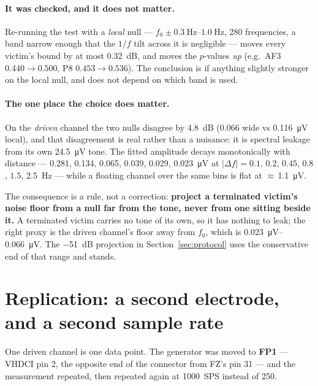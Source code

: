 \documentclass[11pt,a4paper]{article}
\begin{document}
\paragraph{It was checked, and it does not matter.} Re-running the test with a \emph{local}
null --- $f_0 \pm \SIrange{0.3}{1.0}{\hertz}$, 280 frequencies, a band narrow enough that the
$1/f$ tilt across it is negligible --- moves every victim's bound by at most
\SI{0.32}{\deci\bel}, and moves the $p$-values \emph{up} (e.g.\ AF3 $0.440 \to 0.500$,
P8 $0.453 \to 0.536$). The conclusion is if anything slightly stronger on the local null, and
does not depend on which band is used.

\paragraph{The one place the choice does matter.} On the \emph{driven} channel the two nulls
disagree by \SI{4.8}{\deci\bel} (\SI{0.066}{} wide vs \SI{0.116}{\micro\volt} local), and that
disagreement is real rather than a nuisance: it is spectral leakage from its own
\SI{24.5}{\micro\volt} tone. The fitted amplitude decays monotonically with distance ---
\SI{0.281}{}, \SI{0.134}{}, \SI{0.065}{}, \SI{0.039}{}, \SI{0.029}{}, \SI{0.023}{\micro\volt}
at $|\Delta f| = 0.1$, $0.2$, $0.45$, $0.8$, $1.5$, \SI{2.5}{\hertz} --- while a floating
channel over the same bins is flat at $\approx$\,\SI{1.1}{\micro\volt}.

The consequence is a rule, not a correction: \textbf{project a terminated victim's noise floor
from a null far from the tone, never from one sitting beside it.} A terminated victim carries
no tone of its own, so it has nothing to leak; the right proxy is the driven channel's floor
away from $f_0$, which is \SIrange{0.023}{0.066}{\micro\volt}. The
\SI{-51}{\deci\bel} projection in Section~\ref{sec:protocol} uses the conservative end of that
range and stands.

\section{Replication: a second electrode, and a second sample rate}
\label{sec:repl}

One driven channel is one data point. The generator was moved to \textbf{FP1} --- VHDCI pin 2,
the opposite end of the connector from FZ's pin 31 --- and the measurement repeated, then
repeated again at \SI{1000}{SPS} instead of \SI{250}{}.
\end{document}
